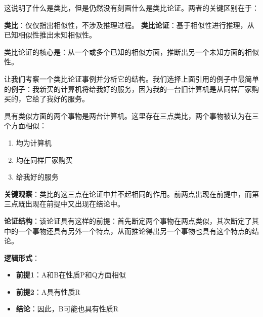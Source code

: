 \begin{theorembox}[title=类比与类比论证的区别]
这说明了什么是类比，但是仍然没有刻画什么是类比论证。两者的关键区别在于：

\textbf{类比}：仅仅指出相似性，不涉及推理过程。
\textbf{类比论证}：基于相似性进行推理，从已知相似性推出未知相似性。

类比论证的核心是：从一个或多个已知的相似方面，推断出另一个未知方面的相似性。
\end{theorembox}

让我们考察一个类比论证事例并分析它的结构。我们选择上面引用的例子中最简单的例子：我新买的计算机将给我好的服务，因为我的一台旧计算机是从同样厂家购买的，它给了我好的服务。

\begin{examplebox}[title=类比论证的结构解析]
具有类似方面的两个事物是两台计算机。这里存在三点类比，两个事物被认为在三个方面相似：
\begin{enumerate}
\item 均为计算机
\item 均在同样厂家购买
\item 给我好的服务
\end{enumerate}

\textbf{关键观察}：类比的这三点在论证中并不起相同的作用。前两点出现在前提中，而第三点既出现在前提中又出现在结论中。

\textbf{论证结构}：该论证具有这样的前提：首先断定两个事物在两点类似，其次断定了其中的一个事物还具有另外一个特点，从而推论得出另一个事物也具有这个特点的结论。

\textbf{逻辑形式}：
\begin{itemize}
\item \textbf{前提1}：A和B在性质P和Q方面相似
\item \textbf{前提2}：A具有性质R
\item \textbf{结论}：因此，B可能也具有性质R
\end{itemize}
\end{examplebox}

